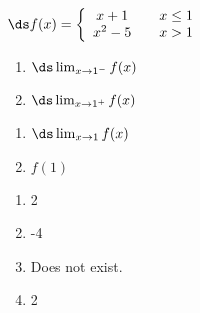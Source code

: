 {$\ds f(x) = \left\{\begin{array}{ccc}
	x+1 & & x\leq 1 \\
	x^2-5 & & x>1
	\end{array}
	\right.
$

\noindent\begin{minipage}[t]{.5\linewidth}
\begin{enumerate}
\item		$\ds \lim_{x\to 1^-} f(x)$
\item		$\ds \lim_{x\to 1^+} f(x)$
\end{enumerate}
\end{minipage}
\noindent\begin{minipage}[t]{.5\linewidth}
\begin{enumerate}\addtocounter{enumii}{2}
\item		$\ds \lim_{x\to 1} f(x)$
\item		$f(1)$\end{enumerate}
\end{minipage}
}
{\begin{enumerate}
\item		2
\item		-4
\item		Does not exist.
\item		2
\end{enumerate}
}


